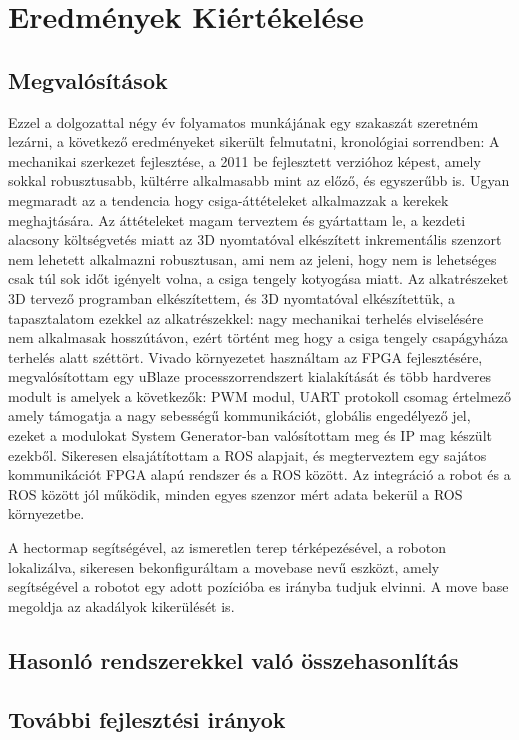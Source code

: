 \chapter{Eredmények Kiértékelése}
\section{Megvalósítások}
Ezzel a dolgozattal négy év folyamatos munkájának egy szakaszát szeretném lezárni, a következő eredményeket sikerült felmutatni, kronológiai sorrendben: 
A mechanikai szerkezet fejlesztése, a 2011 be fejlesztett verzióhoz képest, amely sokkal robusztusabb, kültérre alkalmasabb mint az előző, és egyszerűbb is. Ugyan megmaradt az a tendencia hogy csiga-áttételeket alkalmazzak a kerekek meghajtására. Az áttételeket magam terveztem és gyártattam le, a kezdeti alacsony költségvetés miatt az 3D nyomtatóval elkészített inkrementális szenzort nem lehetett alkalmazni robusztusan, ami nem az jeleni, hogy nem is lehetséges csak túl sok időt igényelt volna, a csiga tengely kotyogása miatt.
Az alkatrészeket 3D tervező programban elkészítettem, és 3D nyomtatóval elkészítettük, a tapasztalatom ezekkel az alkatrészekkel: nagy mechanikai terhelés elviselésére nem alkalmasak hosszútávon, ezért történt meg hogy a csiga tengely csapágyháza terhelés alatt széttört.
Vivado környezetet használtam az FPGA fejlesztésére, megvalósítottam egy uBlaze processzorrendszert kialakítását és több hardveres modult is amelyek a következők: PWM modul, UART protokoll csomag értelmező amely támogatja a nagy sebességű kommunikációt, globális engedélyező jel, ezeket a modulokat System Generator-ban valósítottam meg és IP mag készült ezekből.
Sikeresen elsajátítottam a ROS alapjait, és megterveztem egy sajátos kommunikációt FPGA alapú rendszer és a ROS között. Az integráció a robot és a ROS között jól működik, minden egyes szenzor mért adata bekerül a ROS környezetbe.

A hectormap segítségével, az ismeretlen terep térképezésével, a roboton lokalizálva, sikeresen bekonfiguráltam a movebase nevű eszközt, amely segítségével a robotot egy adott pozícióba es irányba tudjuk elvinni. A move base megoldja az akadályok kikerülését is.


\section{Hasonló rendszerekkel való összehasonlítás}
\section{További fejlesztési irányok}
